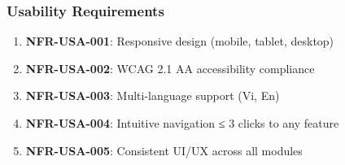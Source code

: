 \subsubsection{Usability Requirements}

\begin{enumerate}
    \item \textbf{NFR-USA-001}: Responsive design (mobile, tablet, desktop)
    \item \textbf{NFR-USA-002}: WCAG 2.1 AA accessibility compliance
    \item \textbf{NFR-USA-003}: Multi-language support (Vi, En)
    \item \textbf{NFR-USA-004}: Intuitive navigation ≤ 3 clicks to any feature
    \item \textbf{NFR-USA-005}: Consistent UI/UX across all modules
\end{enumerate}
